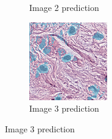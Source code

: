 \begin{figure}[H]
\begin{subfigure}[b]{0.32\textwidth}
    \caption{Image 2 prediction}
  \end{subfigure}\hfill
  \begin{subfigure}[b]{0.32\textwidth}
    \centering
    \includegraphics[width=\linewidth]{assets/images/for_presentation/exp1-3-pred.png}
    \caption{Image 3 prediction}
  \end{subfigure}

  \par\vspace{0.5em}


\end{figure}
